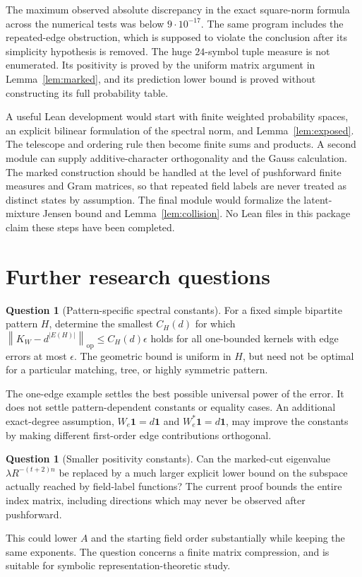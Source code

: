 \documentclass[11pt,a4paper]{article}
\numberwithin{equation}{section}
\theoremstyle{definition}
\newtheorem{question}[theorem]{Question}
\theoremstyle{remark}
\newcommand{\one}{\mathbf 1}
\newcommand{\op}{\mathrm{op}}
\newcommand{\norm}[1]{\left\lVert #1\right\rVert}
\begin{document}
The maximum observed absolute discrepancy in the exact square-norm
formula across the numerical tests was below $9\cdot10^{-17}$.
The same program includes the repeated-edge obstruction, which is
supposed to violate the conclusion after its simplicity hypothesis is
removed. The huge $24$-symbol tuple measure is not enumerated.
Its positivity is proved by the uniform matrix argument in
Lemma~\ref{lem:marked}, and its prediction lower bound is proved
without constructing its full probability table.

A useful Lean development would start with finite weighted probability
spaces, an explicit bilinear formulation of the spectral norm, and
Lemma~\ref{lem:exposed}. The telescope and ordering rule then become
finite sums and products. A second module can supply additive-character
orthogonality and the Gauss calculation. The marked construction should
be handled at the level of pushforward finite measures and Gram matrices,
so that repeated field labels are never treated as distinct states by
assumption. The final module would formalize the latent-mixture Jensen
bound and Lemma~\ref{lem:collision}. No Lean files in this package claim
these steps have been completed.

\section{Further research questions}
\label{sec:questions}

\begin{question}[Pattern-specific spectral constants]
For a fixed simple bipartite pattern $H$, determine the smallest
$C_H(d)$ for which $\norm{K_W-d^{|E(H)|}}_{\op}\le C_H(d)\epsilon$
holds for all one-bounded kernels with edge errors at most $\epsilon$.
The geometric bound is uniform in $H$, but need not be optimal for a
particular matching, tree, or highly symmetric pattern.
\end{question}
The one-edge example settles the best possible universal power of the
error. It does not settle pattern-dependent constants or equality cases.
An additional exact-degree assumption, $W_e\one=d\one$ and
$W_e^*\one=d\one$, may improve the constants by making different
first-order edge contributions orthogonal.

\begin{question}[Smaller positivity constants]
Can the marked-cut eigenvalue $\lambda R^{-(t+2)n}$ be replaced by a
much larger explicit lower bound on the subspace actually reached by
field-label functions? The current proof bounds the entire index matrix,
including directions which may never be observed after pushforward.
\end{question}
This could lower $A$ and the starting field order substantially while
keeping the same exponents. The question concerns a finite matrix
compression, and is suitable for symbolic representation-theoretic study.
\end{document}
